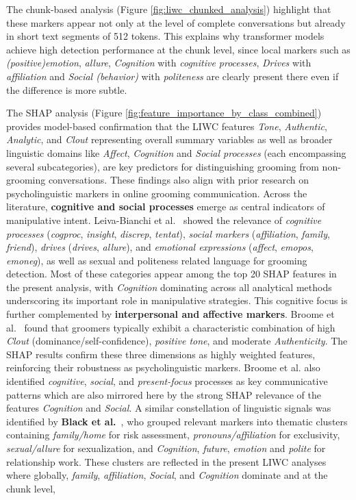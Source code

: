 The chunk-based analysis (Figure \ref{fig:liwc_chunked_analysis}) highlight that these markers appear not only at the level of complete conversations but already in short text segments of 512 tokens. This explains why transformer models achieve high detection performance at the chunk level, since local markers such as \textit{(positive)emotion}, \textit{allure}, \textit{Cognition} with \textit{cognitive processes}, \textit{Drives} with \textit{affiliation} and \textit{Social (behavior)} with \textit{politeness} are clearly present there even if the difference is more subtle.

The SHAP analysis (Figure \ref{fig:feature_importance_by_class_combined}) provides model-based confirmation that the LIWC features \textit{Tone}, \textit{Authentic}, \textit{Analytic}, and \textit{Clout} representing overall summary variables as well as broader linguistic domains like  \textit{Affect}, \textit{Cognition} and \textit{Social processes} (each encompassing several subcategories), are key predictors for distinguishing grooming from non-grooming conversations. These findings also align with prior research on psycholinguistic markers in online grooming communication. Across the literature, \textbf{cognitive and social processes} emerge as central indicators of manipulative intent. Leiva-Bianchi et al.~\cite{leiva2024meta} showed the relevance of \textit{cognitive processes} (\textit{cogproc}, \textit{insight}, \textit{discrep}, \textit{tentat}), \textit{social markers} (\textit{affiliation}, \textit{family}, \textit{friend}), \textit{drives} (\textit{drives}, \textit{allure}), and \textit{emotional expressions} (\textit{affect}, \textit{emopos}, \textit{emoneg}), as well as sexual and politeness related language for grooming detection. Most of these categories appear among the top 20 SHAP features in the present analysis, with \textit{Cognition} dominating across all analytical methods underscoring its important role in manipulative strategies. This cognitive focus is further complemented by \textbf{interpersonal and affective markers}. Broome et al.~\cite{broome2020psycholinguistic} found that groomers typically exhibit a characteristic combination of high \textit{Clout} (dominance/self-confidence), \textit{positive tone}, and moderate \textit{Authenticity}. The SHAP results confirm these three dimensions as highly weighted features, reinforcing their robustness as psycholinguistic markers. Broome et al. also identified \textit{cognitive}, \textit{social}, and \textit{present-focus} processes as key communicative patterns which are also mirrored here by the strong SHAP relevance of the features \textit{Cognition} and \textit{Social}. A similar constellation of linguistic signals was identified by \textbf{Black et al.}~\cite{black2015linguistic}, who grouped relevant markers into thematic clusters containing \textit{family/home} for risk assessment, \textit{pronouns/affiliation} for exclusivity, \textit{sexual/allure} for sexualization, and \textit{Cognition}, \textit{future}, \textit{emotion} and \textit{polite} for relationship work. These clusters are reflected in the present LIWC analyses where globally, \textit{family}, \textit{affiliation}, \textit{Social}, and \textit{Cognition} dominate and at the chunk level, 